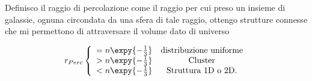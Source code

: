 Definisco il raggio di percolazione come il raggio per cui preso un insieme di galassie, ognuna circondata da una sfera di tale raggio, ottengo strutture connesse che mi permettono di attraversare il volume dato di universo

\begin{equation*}
    r_{Perc}\left\{\begin{array}{cc}
                =n\expy{-\frac{1}{3}}&\text{distribuzione uniforme}\\
                >n\expy{-\frac{1}{3}}&\text{Cluster}\\
                <n\expy{-\frac{1}{3}}&\text{Struttura 1D o 2D.}\\
    \end{array}\right.
\end{equation*}

\clearpage
